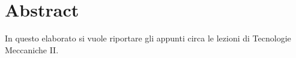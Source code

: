 \chapter{Abstract}
In questo elaborato si vuole riportare gli appunti circa le lezioni di Tecnologie Meccaniche II.